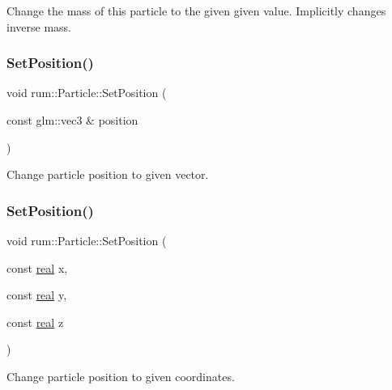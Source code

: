 Change the mass of this particle to the given given value. Implicitly changes inverse mass. \mbox{\label{classrum_1_1_particle_a2c564f2fe0122a6dd33b8113fde29e6d}} 
\subsubsection{\texorpdfstring{Set\+Position()}{SetPosition()}\hspace{0.1cm}{\footnotesize\ttfamily [1/2]}}
{\footnotesize\ttfamily void rum\+::\+Particle\+::\+Set\+Position (\begin{DoxyParamCaption}\item[{const glm\+::vec3 \&}]{position }\end{DoxyParamCaption})}

Change particle position to given vector. \mbox{\label{classrum_1_1_particle_a1886668419cd31d6e0dacd1b62087ca0}} 
\subsubsection{\texorpdfstring{Set\+Position()}{SetPosition()}\hspace{0.1cm}{\footnotesize\ttfamily [2/2]}}
{\footnotesize\ttfamily void rum\+::\+Particle\+::\+Set\+Position (\begin{DoxyParamCaption}\item[{const \hyperlink{namespacerum_a7e8cca23573d5eaead0f138cbaa4862c}{real}}]{x,  }\item[{const \hyperlink{namespacerum_a7e8cca23573d5eaead0f138cbaa4862c}{real}}]{y,  }\item[{const \hyperlink{namespacerum_a7e8cca23573d5eaead0f138cbaa4862c}{real}}]{z }\end{DoxyParamCaption})}

Change particle position to given coordinates. \mbox{\label{classrum_1_1_particle_a48c69c70728f76190cf698a0bb733607}} 
